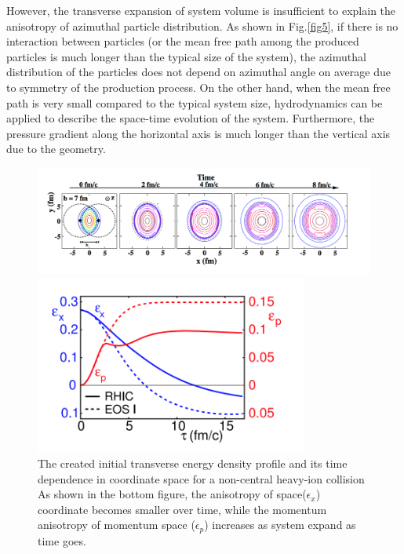 	However, the transverse expansion of system volume is insufficient to explain the anisotropy of azimuthal particle distribution. As shown in Fig.\ref{fig5}, if there is no interaction between particles (or the mean free path among the produced particles is much longer than the typical size of the system), the azimuthal distribution of the particles does not depend on azimuthal angle on average due to symmetry of the production process. On the other hand, when the mean free path is very small compared to the typical system size, hydrodynamics can be applied to describe the space-time evolution of the system. Furthermore, the pressure gradient along the horizontal axis is much longer than the vertical axis due to the geometry.
 

 	
\begin{figure}[t]
\centerline{\includegraphics[width=12.0cm]{figures/system_time_flow}}
\centerline{\includegraphics[width=9.0cm]{figures/time_ecenx_ecenp}}
\caption{The created initial transverse energy density profile and its time
dependence in coordinate space for a non-central heavy-ion collision \cite{Kolb:2003dz} As shown in the bottom figure, the anisotropy of space($\epsilon_x$) coordinate becomes smaller over time, while the momentum anisotropy of momentum space ($\epsilon_p$) increases as system expand as time goes. }
\label{fig4}
\end{figure}


